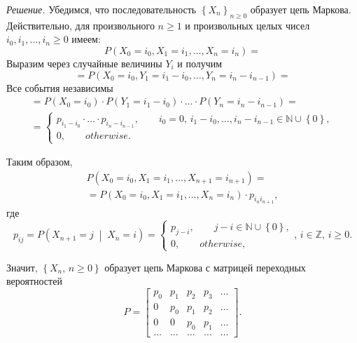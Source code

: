 \textit{Решение.}
Убедимся, что последовательность $ \left\{ X_n \right\}_{n \geq 0}$ образует цепь Маркова.
Действительно,
для произвольного $n \geq 1$ и произвольных целых чисел $i_0, i_1, \dotsc, i_n \geq 0$ имеем:
\begin{equation*}
  P \left( X_0 = i_0, X_1 = i_1, \dotsc, X_n = i_n \right) =
\end{equation*}
Выразим через случайные величины $Y_i$ и получим
\begin{equation*}
  = P \left( X_0 = i_0, Y_1 = i_1 - i_0, \dotsc, Y_n = i_n - i_{n - 1} \right) =
\end{equation*}
Все события независимы
\begin{gather*}
  = P \left( X_0 = i_0 \right) \cdot P \left( Y_1 = i_1 - i_0 \right) \cdot \dotsc \cdot
  P \left( Y_n = i_n - i_{n - 1} \right) = \\
  = \begin{cases}
    p_{i_1 - i_0} \cdot \dotsc \cdot p_{i_n - i_{n - 1}}, \qquad
    i_0 = 0, \, i_1 - i_0, \dotsc, i_n - i_{n - 1} \in \mathbb{N} \cup \left\{ 0 \right\}, \\
    0, \qquad otherwise.
  \end{cases}
\end{gather*}

Таким образом,
\begin{gather*}
  P \left( X_0 = i_0, X_1 = i_1, \dotsc, X_{n + 1} = i_{n + 1} \right) = \\
  = P \left( X_0 = i _0, X_1 = i_1, \dotsc, X_n = i_n \right) \cdot p_{i_n i_{n + 1}},
\end{gather*}
где
\begin{equation*}
  p_{ij} =
  P \left( X_{n + 1} = j \; \middle| \; X_n = i \right) =
  \begin{cases}
    p_{j - i}, \qquad j - i \in \mathbb{N} \cup \left\{ 0 \right\}, \\
    0, \qquad otherwise,
  \end{cases}, \, i \in \mathbb{Z}, \, i \geq 0.
\end{equation*}

Значит, $ \left\{ X_n, \, n \geq 0 \right\} $
образует цепь Маркова с матрицей переходных вероятностей
\begin{equation*}
  P =
  \begin{bmatrix}
    p_0 & p_1 & p_2 & p_3 & \dotsc \\
    0 & p_0 & p_1 & p_2 & \dotsc \\
    0 & 0 & p_0 & p_1 & \dotsc \\
    \dotsc & \dotsc & \dotsc & \dotsc & \dotsc
  \end{bmatrix}.
\end{equation*}


